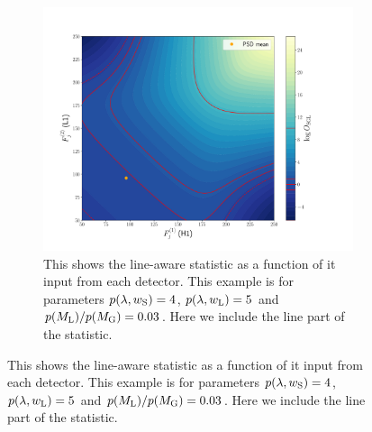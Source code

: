 \begin{figure}
\begin{subfigure}[h]{\linewidth}
\begin{minipage}{0.65\linewidth}
\includegraphics[width=0.9\columnwidth]{C3_soap/lookup_linesmall.pdf}
\end{minipage}\hfill
\begin{minipage}{0.35\linewidth}
\caption{This shows the line-aware statistic as a function of it input from each detector. This example is for parameters $p(\lambda,w_{\rm{S}}) = 4$, $p(\lambda,w_{\rm{L}}) = 5$ and $p(M_{\rm{L}})/p(M_{\rm{G}}) = 0.03$. Here we include the line part of the statistic.}
\label{soap:las:detp:linesmall}
\end{minipage}
\end{subfigure}


\end{figure}
